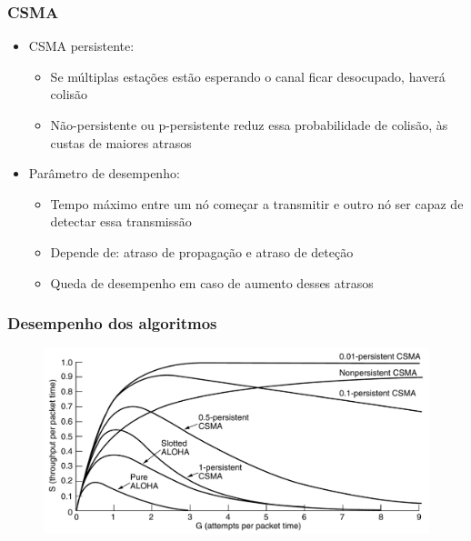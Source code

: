 \begin{frame}
	\frametitle{CSMA}
	
	\begin{itemize}		
		\item CSMA persistente:
		\begin{itemize}
		    \item Se múltiplas estações estão esperando o canal ficar desocupado, haverá colisão
		    \item Não-persistente ou p-persistente reduz essa probabilidade de colisão, às custas de maiores atrasos
		\end{itemize}\vspace{0.4cm}
		\item Parâmetro de desempenho:
		\begin{itemize}
		    \item Tempo máximo entre um nó começar a transmitir e outro nó ser capaz de detectar essa transmissão
		    \item Depende de: atraso de propagação e atraso de deteção
		    \item Queda de desempenho em caso de aumento desses atrasos
		\end{itemize}
	\end{itemize}
	
\end{frame}

\begin{frame}
	\frametitle{Desempenho dos algoritmos}
	
	\begin{figure}[t]
		\begin{center}
			\includegraphics[width=0.95\columnwidth]{figs/fig04-04}
		\end{center}
	\end{figure}
	
\end{frame}

